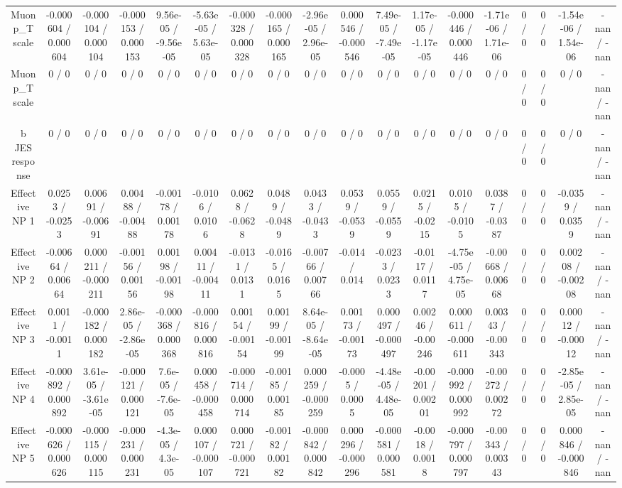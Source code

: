 \documentclass[10pt]{article}
\begin{document}
\begin{table}[htbp]
\begin{center}
\begin{tabular}{|c|c|c|c|c|c|c|c|c|c|c|c|c|c|c|c|c|c|}
  Muon p_{T} scale & -0.000604 / 0.000604 & -0.000104 / 0.000104 & -0.000153 / 0.000153 & 9.56e-05 / -9.56e-05 & -5.63e-05 / 5.63e-05 & -0.000328 / 0.000328 & -0.000165 / 0.000165 & -2.96e-05 / 2.96e-05 & 0.000546 / -0.000546 & 7.49e-05 / -7.49e-05 & 1.17e-05 / -1.17e-05 & -0.000446 / 0.000446 & -1.71e-06 / 1.71e-06 & 0 / 0 & 0 / 0 & -1.54e-06 / 1.54e-06 & -nan / -nan \\ 
  Muon p_{T} scale & 0 / 0 & 0 / 0 & 0 / 0 & 0 / 0 & 0 / 0 & 0 / 0 & 0 / 0 & 0 / 0 & 0 / 0 & 0 / 0 & 0 / 0 & 0 / 0 & 0 / 0 & 0 / 0 & 0 / 0 & 0 / 0 & -nan / -nan \\ 
  b JES response & 0 / 0 & 0 / 0 & 0 / 0 & 0 / 0 & 0 / 0 & 0 / 0 & 0 / 0 & 0 / 0 & 0 / 0 & 0 / 0 & 0 / 0 & 0 / 0 & 0 / 0 & 0 / 0 & 0 / 0 & 0 / 0 & -nan / -nan \\ 
  Effective NP 1 & 0.0253 / -0.0253 & 0.00691 / -0.00691 & 0.00488 / -0.00488 & -0.00178 / 0.00178 & -0.0106 / 0.0106 & 0.0628 / -0.0628 & 0.0489 / -0.0489 & 0.0433 / -0.0433 & 0.0539 / -0.0539 & 0.0559 / -0.0559 & 0.0215 / -0.0215 & 0.0105 / -0.0105 & 0.0387 / -0.0387 & 0 / 0 & 0 / 0 & -0.0359 / 0.0359 & -nan / -nan \\ 
  Effective NP 2 & -0.00664 / 0.00664 & 0.000211 / -0.000211 & -0.00156 / 0.00156 & 0.00198 / -0.00198 & 0.00411 / -0.00411 & -0.0131 / 0.0131 & -0.0165 / 0.0165 & -0.00766 / 0.00766 & -0.014 / 0.014 & -0.0233 / 0.0233 & -0.0117 / 0.0117 & -4.75e-05 / 4.75e-05 & -0.00668 / 0.00668 & 0 / 0 & 0 / 0 & 0.00208 / -0.00208 & -nan / -nan \\ 
  Effective NP 3 & 0.0011 / -0.0011 & -0.000182 / 0.000182 & 2.86e-05 / -2.86e-05 & -0.000368 / 0.000368 & -0.000816 / 0.000816 & 0.00154 / -0.00154 & 0.00199 / -0.00199 & 8.64e-05 / -8.64e-05 & 0.00173 / -0.00173 & 0.000497 / -0.000497 & 0.00246 / -0.00246 & 0.000611 / -0.000611 & 0.00343 / -0.00343 & 0 / 0 & 0 / 0 & 0.00012 / -0.00012 & -nan / -nan \\ 
  Effective NP 4 & -0.000892 / 0.000892 & 3.61e-05 / -3.61e-05 & -0.000121 / 0.000121 & 7.6e-05 / -7.6e-05 & 0.000458 / -0.000458 & -0.000714 / 0.000714 & -0.00185 / 0.00185 & 0.000259 / -0.000259 & -0.0005 / 0.0005 & -4.48e-05 / 4.48e-05 & -0.00201 / 0.00201 & -0.000992 / 0.000992 & -0.00272 / 0.00272 & 0 / 0 & 0 / 0 & -2.85e-05 / 2.85e-05 & -nan / -nan \\ 
  Effective NP 5 & -0.000626 / 0.000626 & -0.000115 / 0.000115 & -0.000231 / 0.000231 & -4.3e-05 / 4.3e-05 & 0.000107 / -0.000107 & 0.000721 / -0.000721 & -0.00182 / 0.00182 & -0.000842 / 0.000842 & 0.000296 / -0.000296 & -0.000581 / 0.000581 & -0.0018 / 0.0018 & -0.000797 / 0.000797 & -0.00343 / 0.00343 & 0 / 0 & 0 / 0 & 0.000846 / -0.000846 & -nan / -nan \\ 

\end{tabular}
\end{center}
\end{table}
\end{document}
